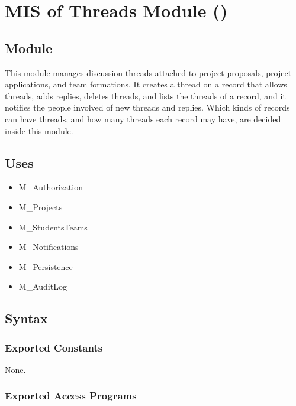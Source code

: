 \documentclass[12pt, titlepage]{article}
\newcommand{\moduleid}[1]{\texttt{\detokenize{#1}}}
\begin{document}
\newpage

\section[MIS of Threads Module]{MIS of Threads Module (\moduleid{M_Threads})}
\label{M_Threads}

\subsection{Module}

This module manages discussion threads attached to project proposals, project applications, and team formations. It creates a thread on a record that allows threads, adds replies, deletes threads, and lists the threads of a record, and it notifies the people involved of new threads and replies. Which kinds of records can have threads, and how many threads each record may have, are decided inside this module.

\subsection{Uses}

\begin{itemize}
    \item M\_Authorization
    \item M\_Projects
    \item M\_StudentsTeams
    \item M\_Notifications
    \item M\_Persistence
    \item M\_AuditLog
\end{itemize}

\subsection{Syntax}

\subsubsection{Exported Constants}
None.

\subsubsection{Exported Access Programs}
\end{document}
